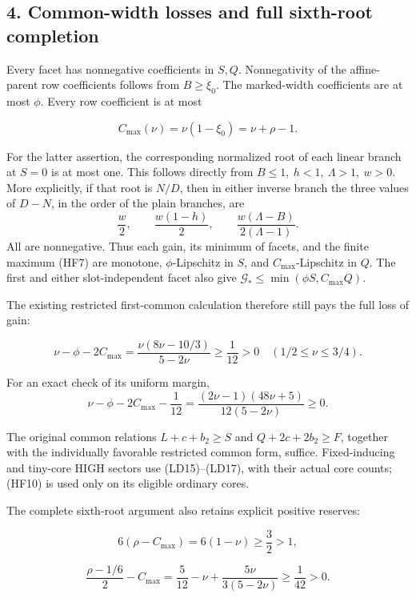 \hypertarget{feedback:common-width-losses-and-full-sixth-root-completion}{%
\subsection{4. Common-width losses and full sixth-root completion}\label{feedback:common-width-losses-and-full-sixth-root-completion}}

Every facet has nonnegative coefficients in \(S,Q\). Nonnegativity of the affine-parent row coefficients follows from \(B\ge\xi_0\). The marked-width coefficients are at most \(\phi\). Every row coefficient is at most

\[
 C_{\max}(\nu)=\nu(1-\xi_0)=\nu+\rho-1.
\tag{HF11}
\]

For the latter assertion, the corresponding normalized root of each linear branch at \(S=0\) is at most one. This follows directly from \(B\le1,\ h<1,\ \Lambda>1,\ w>0\). More explicitly, if that root is \(N/D\), then in either inverse branch the three values of \(D-N\), in the order of the plain branches, are \[
 \frac w2,\qquad\frac{w(1-h)}2,\qquad
 \frac{w(\Lambda-B)}{2(\Lambda-1)}.
\] All are nonnegative. Thus each gain, its minimum of facets, and the finite maximum (HF7) are monotone, \(\phi\)-Lipschitz in \(S\), and \(C_{\max}\)-Lipschitz in \(Q\). The first and either slot-independent facet also give \(\mathcal G_*\le\min(\phi S,C_{\max}Q)\).

The existing restricted first-common calculation therefore still pays the full loss of gain:

\[
 \nu-\phi-2C_{\max}
 =\frac{\nu(8\nu-10/3)}{5-2\nu}
 \ge\frac1{12}>0
 \quad(1/2\le\nu\le3/4).
\tag{HF12}
\]

For an exact check of its uniform margin, \[
 \nu-\phi-2C_{\max}-\frac1{12}
 =\frac{(2\nu-1)(48\nu+5)}{12(5-2\nu)}\ge0.
\]

The original common relations \(L+c+b_2\ge S\) and \(Q+2c+2b_2\ge F\), together with the individually favorable restricted common form, suffice. Fixed-inducing and tiny-core HIGH sectors use (LD15)--(LD17), with their actual core counts; (HF10) is used only on its eligible ordinary cores.

The complete sixth-root argument also retains explicit positive reserves:

\[
 6(\rho-C_{\max})=6(1-\nu)\ge\frac32>1,
\tag{HF13}
\]

\[
 \frac{\rho-1/6}{2}-C_{\max}
 =\frac5{12}-\nu+\frac{5\nu}{3(5-2\nu)}
 \ge\frac1{42}>0.
\tag{HF14}
\]

